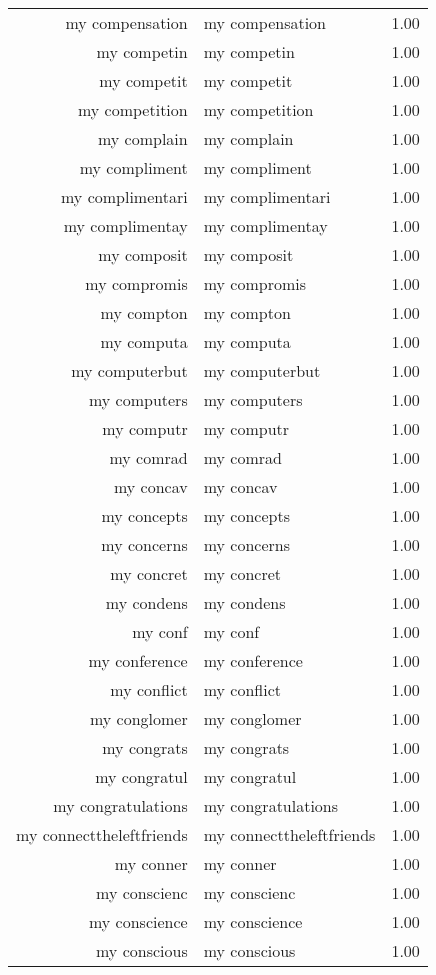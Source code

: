 \begin{table}[ht]
\begin{tabular}{rlr}
  my compensation & my compensation & 1.00 \\ 
  my competin & my competin & 1.00 \\ 
  my competit & my competit & 1.00 \\ 
  my competition & my competition & 1.00 \\ 
  my complain & my complain & 1.00 \\ 
  my compliment & my compliment & 1.00 \\ 
  my complimentari & my complimentari & 1.00 \\ 
  my complimentay & my complimentay & 1.00 \\ 
  my composit & my composit & 1.00 \\ 
  my compromis & my compromis & 1.00 \\ 
  my compton & my compton & 1.00 \\ 
  my computa & my computa & 1.00 \\ 
  my computerbut & my computerbut & 1.00 \\ 
  my computers & my computers & 1.00 \\ 
  my computr & my computr & 1.00 \\ 
  my comrad & my comrad & 1.00 \\ 
  my concav & my concav & 1.00 \\ 
  my concepts & my concepts & 1.00 \\ 
  my concerns & my concerns & 1.00 \\ 
  my concret & my concret & 1.00 \\ 
  my condens & my condens & 1.00 \\ 
  my conf & my conf & 1.00 \\ 
  my conference & my conference & 1.00 \\ 
  my conflict & my conflict & 1.00 \\ 
  my conglomer & my conglomer & 1.00 \\ 
  my congrats & my congrats & 1.00 \\ 
  my congratul & my congratul & 1.00 \\ 
  my congratulations & my congratulations & 1.00 \\ 
  my connecttheleftfriends & my connecttheleftfriends & 1.00 \\ 
  my conner & my conner & 1.00 \\ 
  my conscienc & my conscienc & 1.00 \\ 
  my conscience & my conscience & 1.00 \\ 
  my conscious & my conscious & 1.00 \\ 

\end{tabular}
\end{table}
